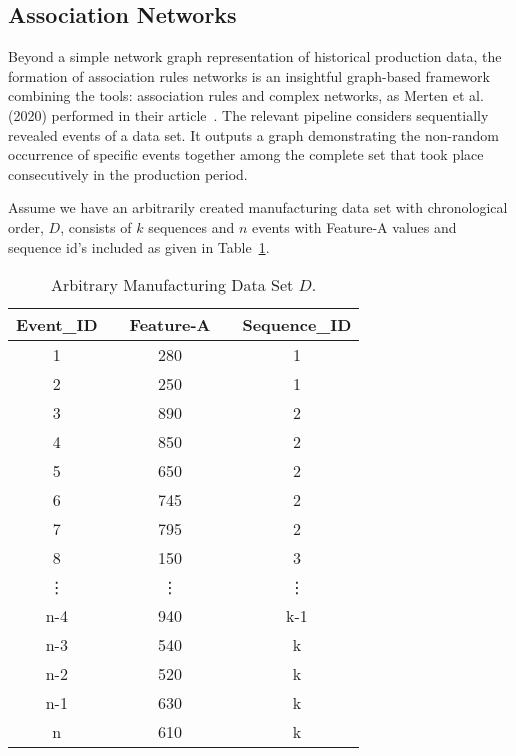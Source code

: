 \subsection*{Association Networks}
%
{\color{red}Beyond a simple network graph representation of historical production data, the formation of association rules networks is an insightful graph-based framework combining the tools: association rules and complex networks, as Merten et al. (2020) performed in their article~\cite{MERTEN2020}. The relevant pipeline considers sequentially revealed events of a data set.} It outputs a graph demonstrating the non-random occurrence of specific events together among the complete set that took place consecutively in the production period.

Assume we have an arbitrarily created manufacturing data set with chronological order, $D$, consists of $k$ sequences and $n$ events with Feature-A values and sequence id's included as given in Table~\ref{Tab:D-dataset}.
\renewcommand{\arraystretch}{1.1}
\begin{table}[ht!]
	\centering
	\setlength{\arrayrulewidth}{0.75pt}%
	\begin{tabular}{|c|ccc|c|}
		\hline \rowcolor[HTML]{FFFFC7}
		Event\_ID && Feature-A && Sequence\_ID   \\ \hline
		1 	      && 280  	&& 1 		   	  \\
		2 		  && 250	&& 1 		   	  \\
		3 	      && 890	&& 2 		      \\
		4 		  && 850	&& 2 		      \\
		5 	      && 650	&& 2   		      \\
		6 	      && 745	&& 2 		      \\
		7 		  && 795	&& 2 		      \\
		8 		  && 150	&& 3 		      \\
		\vdots	  && \vdots && \vdots 	      \\
		n-4 	  && 940  	&& k-1	 	      \\
		n-3 	  && 540  	&& k			  \\
		n-2 	  && 520	&& k 		      \\
		n-1       && 630	&& k 		      \\
		n 		  && 610	&& k 		      \\ \hline
	\end{tabular}
	\caption{Arbitrary Manufacturing Data Set $D$.}
	\label{Tab:D-dataset}
\end{table}

